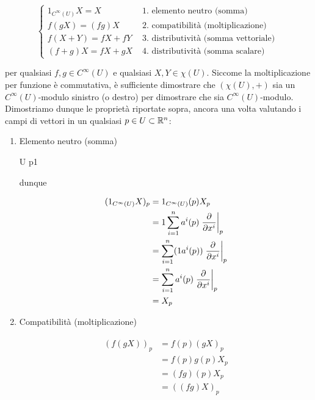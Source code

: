 {\begin{equation}
	\begin{cases}
		1_{C^{\infty}(U)} X = X & \text{ 1. elemento neutro (somma) } \\
		f (g X) = (f g) X & \text{ 2. compatibilità (moltiplicazione) } \\
		f (X+Y) = f X + f Y & \text{ 3. distributività (somma vettoriale) } \\
		(f+g) X = f X + g X & \text{ 4. distributività (somma scalare) }
	\end{cases}
\end{equation}

per qualsiasi $ f,g \in C^{\infty}(U) $ e qualsiasi $ X,Y \in \chi(U) $. Siccome la moltiplicazione per funzione è commutativa, è sufficiente dimostrare che $ (\chi(U),+) $ sia un $ C^{\infty}(U) $-modulo sinistro (o destro) per dimostrare che sia $ C^{\infty}(U) $-modulo. \\
Dimostriamo dunque le proprietà riportate sopra, ancora una volta valutando i campi di vettori in un qualsiasi $ p \in U \subset \mathbb{R}^{n} $:

\begin{enumerate}
	\item Elemento neutro (somma)
	
		{U}{\R}
		{p}{1}
	
	dunque
	
	\begin{align}
		\begin{split}
			(1_{C^{\infty}(U)} X)_{p} &= 1_{C^{\infty}(U)} (p) X_{p} \\
			&= 1 \sum_{i=1}^{n} a^{i} (p) \eval{ \pdv{x^{i}} }_{p} \\
			&= \sum_{i=1}^{n} (1 a^{i} (p)) \eval{ \pdv{x^{i}} }_{p} \\
			&= \sum_{i=1}^{n} a^{i} (p) \eval{ \pdv{x^{i}} }_{p} \\
			&= X_{p}
		\end{split}
	\end{align}
	
	\item Compatibilità (moltiplicazione)
	
	\begin{align}
		\begin{split}
			(f (g X))_{p} &= f (p) (g X)_{p} \\
			&= f (p) g (p) X_{p} \\
			&= (f g) (p) X_{p} \\
			&= ((f g) X)_{p}
		\end{split}
	\end{align}
	

\end{enumerate}}
